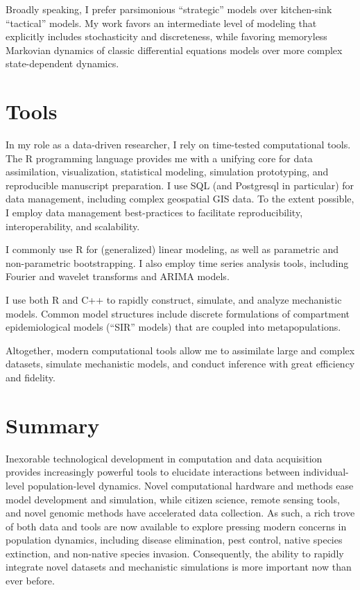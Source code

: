 \documentclass[12pt]{article}
\begin{document}
Broadly speaking, I prefer parsimonious ``strategic'' models 
over kitchen-sink ``tactical'' models. My work favors an intermediate 
level of modeling that explicitly includes stochasticity and 
discreteness, while favoring memoryless Markovian dynamics of 
classic differential equations models over  
more complex state-dependent dynamics. 

\section*{Tools}
In my role as a data-driven researcher, I rely on time-tested
computational tools. The R programming language provides me with a
unifying core for data assimilation, visualization, statistical
modeling, simulation prototyping, and reproducible manuscript 
preparation.   
I use SQL (and Postgresql in particular) for data management, 
including complex geospatial GIS data. To the extent possible, I  
employ data management best-practices to facilitate reproducibility,
interoperability, and scalability.

I commonly use R for (generalized) linear modeling, as well as 
parametric and non-parametric bootstrapping. I also 
employ time series analysis tools, including Fourier 
and wavelet transforms and ARIMA models.

I use both R and C++ to rapidly construct, simulate, and
analyze mechanistic models. Common model structures include 
discrete formulations of compartment epidemiological models 
(``SIR'' models) that are coupled into metapopulations.

Altogether, modern computational tools allow me to
assimilate large and complex datasets, simulate mechanistic
models, and conduct inference with great efficiency and fidelity.

\section*{Summary}
Inexorable technological development
in computation and data acquisition
provides increasingly powerful tools to
elucidate interactions between individual-level
population-level dynamics. 
Novel computational hardware and methods ease model 
development and simulation, while citizen science, remote
sensing tools, and novel genomic methods have accelerated
data collection. As such, a rich trove of both data and 
tools are now available to explore pressing modern concerns
in population dynamics, including disease elimination, 
pest control, native species extinction, 
and non-native species 
invasion.  Consequently, the ability to rapidly 
integrate novel datasets and mechanistic simulations 
is more important now than ever before.
\end{document}
